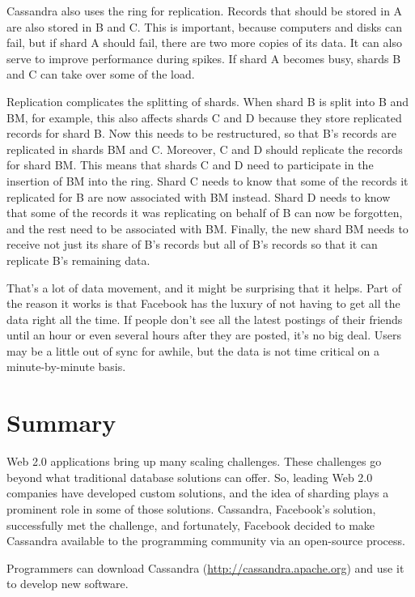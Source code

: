 Cassandra also uses the ring for replication.
Records that should be stored in A
are also stored in B and C.
This is important, because computers and disks can fail,
but if shard A should fail, there are two more copies of its data.
It can also serve to improve performance during spikes.
If shard A becomes busy, shards B and C can take over some of the load.

Replication complicates the splitting of shards.
When shard B is split into B and BM, for example, this also affects shards C and D
because they store replicated records for shard B.
Now this needs to be restructured, so that B's records are replicated in shards BM and C.
Moreover, C and D should replicate the records for shard BM.
This means that shards C and D need
to participate in the insertion of BM into the ring.
Shard C needs to know that some of the records
it replicated for B are now associated with BM instead.
Shard D needs to know that some of the records it was replicating
on behalf of B can now be forgotten, and the rest need to be associated with BM.
Finally, the new shard BM needs to receive not just its share
of B's records but all of B's records so that it can replicate B's remaining data.

That's a lot of data movement, and it might be surprising that it helps.
Part of the reason it works is that Facebook has the luxury of not having
to get all the data right all the time.
If people don't see all the latest postings of their friends until
an hour or even several hours after they are posted, it's no big deal.
Users may be a little out of sync for awhile, but the data is not time critical
on a minute-by-minute basis.

\section{Summary}

Web 2.0 applications bring up many scaling challenges.
These challenges go beyond what traditional database solutions can offer.
So, leading Web 2.0 companies have developed custom solutions,
and the idea of sharding plays a prominent role in some of those solutions.
Cassandra, Facebook's solution, successfully met the challenge, and
fortunately, Facebook decided to make Cassandra available to the
programming community via an open-source process.

Programmers can download Cassandra (\url{http://cassandra.apache.org})
and use it to develop new software.

